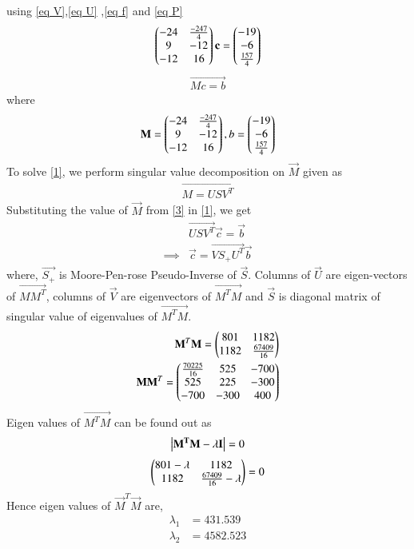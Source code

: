 \documentclass[journal,12pt,twocolumn]{IEEEtran}
\begin{document}
using \eqref{eq V},\eqref{eq U} ,\eqref{eq f} and \eqref{eq P}
\begin{align}
    \begin{pmatrix}-24& \frac{-247}{4}\\ 9 & -12 \\  -12 & 16 \end{pmatrix}\mathbf{c}=\begin{pmatrix}-19 \\ -6\\ \frac{157}{4}\end{pmatrix} 
\end{align}
\begin{align}
\vec{Mc=b} \label{1}
\end{align}
where
\begin{align}
\mathbf{M} = \begin{pmatrix}-24 & \frac{-247}{4} \\ 9 & -12 \\ -12 & 16\end{pmatrix},b = \begin{pmatrix}-19 \\-6\\\frac{157}{4}\end{pmatrix}\label{2}	
\end{align}
To solve \eqref{1}, we perform singular value decomposition on $\vec{M}$ given as 
\begin{align}
	\vec{M = USV^T }\label{3}
\end{align}
Substituting the value of $\vec{M}$ from \eqref{3} in \eqref{1}, we get
\begin{align}
	&\vec{USV^T}\vec{c} = \vec{b} \\
\implies& \vec{c} = \vec{VS_+U^T}\vec{b}\label{4}
\end{align}
where, $\vec{S_+}$ is Moore-Pen-rose Pseudo-Inverse of $\vec{S}$. Columns of $\vec{U}$ are eigen-vectors of $\vec{MM^T}$, columns of $\vec{V}$ are eigenvectors of $\vec{M^TM}$ and $\vec{S}$ is diagonal matrix of singular value of eigenvalues of $\vec{M^TM}$.
\begin{align}
\mathbf{M}^T\mathbf{M}=\begin{pmatrix}801&1182\\1182&\frac{67409}{16}\end{pmatrix}\label{eqMTM}\\
\mathbf{M}\mathbf{M}^T=\begin{pmatrix}\frac{70225}{16}&525&-700\\525&225&-300\\-700&-300&400\end{pmatrix}
\end{align}
Eigen values of $\vec{M^TM}$ can be found out as
\begin{align}
	 \left\vert\mathbf{M^TM-\lambda I}\right\vert = 0
\end{align}
\begin{align}
\begin{pmatrix}801-\lambda&1182\\1182&\frac{67409}{16}-\lambda\end{pmatrix}=0\label{eqMTM}
\end{align}
Hence eigen values of $\vec{M}^T\vec{M}$ are,
\begin{align}
\lambda_1 &=431.539\\
\lambda_2 &= 4582.523\\
\end{align}
\end{document}
